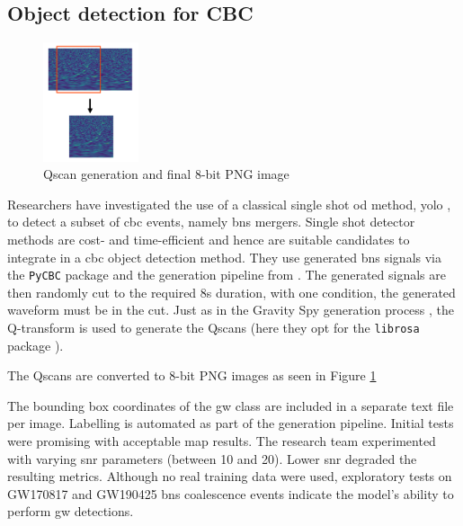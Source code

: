 \subsection{Object detection for CBC}
\begin{figure}
    \includegraphics[width=0.25\textwidth]{Images/od_bns.png}
    \caption{Qscan generation and final 8-bit PNG image \citep{aveiro2022identification}}
    \label{fig:od_bns}
\end{figure}
Researchers \citep{aveiro2022identification} have investigated the use of a classical single shot \acrlong{od} method, \acrfull{yolo} \citep{redmon2016you}, to detect a subset of \acrshort{cbc} events, namely \acrshort{bns} mergers. Single shot detector methods are cost- and time-efficient \citep{redmon2017yolo9000} and hence are suitable candidates to integrate in a \acrshort{cbc} object detection method. 
They use generated \acrshort{bns} signals via the \verb|PyCBC| package \citep{nitz2020gwastro} and the generation pipeline from \citep{gebhard2019convolutional}. The generated signals are then randomly cut to the required 8s duration, with one condition, the generated waveform must be in the cut. 
Just as in the Gravity Spy generation process \citep{zevin2017gravity}, the Q-transform \citep{chatterji2004multiresolution} is used to generate the Qscans (here they opt for the \verb|librosa| package \citep{mcfee2015librosa}). 

The Qscans are converted to 8-bit PNG images as seen in Figure \ref{fig:od_bns}

The bounding box coordinates of the \acrshort{gw} class are included in a separate text file per image. Labelling is automated as part of the generation pipeline. Initial tests were promising with acceptable \acrfull{map} results. The research team experimented with varying \acrshort{snr} parameters (between 10 and 20). Lower \acrshort{snr} degraded the resulting metrics. Although no real training data were used, exploratory tests on GW170817 \citep{abbott2017gw170817} and GW190425 \citep{abbott2020gw190425} \acrshort{bns} coalescence events indicate the model's ability to perform \acrshort{gw} detections.



